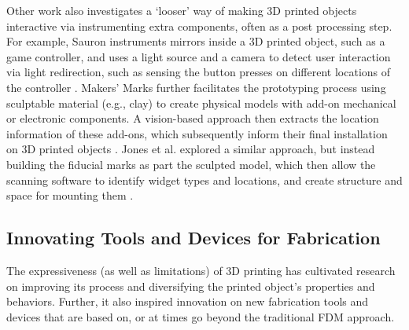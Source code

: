 Other work also investigates a `looser' way of making 3D printed objects interactive via instrumenting extra components, often as a post processing step. For example, Sauron instruments mirrors inside a 3D printed object, such as a game controller, and uses a light source and a camera to detect user interaction via light redirection, such as sensing the button presses on different locations of the controller \cite{savage2013sauron}. Makers' Marks further facilitates the prototyping process using sculptable material (e.g., clay) to create physical models with add-on mechanical or electronic components. A vision-based approach then extracts the location information of these add-ons, which subsequently inform their final installation on 3D printed objects \cite{savage2015makers}. Jones et al. explored a similar approach, but instead building the fiducial marks as part the sculpted model, which then allow the scanning software to identify widget types and locations, and create structure and space for mounting them \cite{jones2016you}.



\subsection{Innovating Tools and Devices for Fabrication}
The expressiveness (as well as limitations) of 3D printing has cultivated research on improving its process and diversifying the printed object's properties and behaviors. Further, it also inspired innovation on new fabrication tools and devices that are based on, or at times go beyond the traditional FDM approach.

